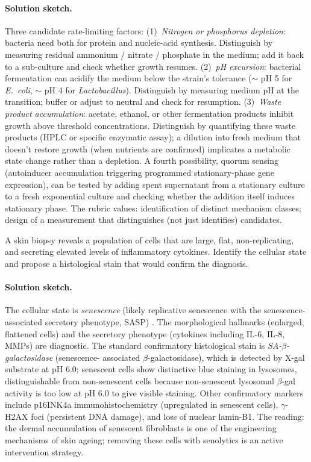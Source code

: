 \paragraph{Solution sketch.}
Three candidate rate-limiting factors:
(1)~\emph{Nitrogen or phosphorus depletion}: bacteria need both for
protein and nucleic-acid synthesis. Distinguish by measuring residual
ammonium / nitrate / phosphate in the medium; add it back to a
sub-culture and check whether growth resumes.
(2)~\emph{pH excursion}: bacterial fermentation can acidify the
medium below the strain's tolerance ($\sim$ pH 5 for \emph{E.~coli},
$\sim$ pH 4 for \emph{Lactobacillus}). Distinguish by measuring
medium pH at the transition; buffer or adjust to neutral and check
for resumption.
(3)~\emph{Waste product accumulation}: acetate, ethanol, or other
fermentation products inhibit growth above threshold concentrations.
Distinguish by quantifying these waste products (HPLC or specific
enzymatic assay); a dilution into fresh medium that doesn't restore
growth (when nutrients are confirmed) implicates a metabolic state
change rather than a depletion. A fourth possibility, quorum sensing
(autoinducer accumulation triggering programmed stationary-phase
gene expression), can be tested by adding spent supernatant from a
stationary culture to a fresh exponential culture and checking
whether the addition itself induces stationary phase. The rubric
values: identification of distinct mechanism classes; design of a
measurement that distinguishes (not just identifies) candidates.

\begin{exercise}
A skin biopsy reveals a population of cells that are large, flat,
non-replicating, and secreting elevated levels of inflammatory
cytokines. Identify the cellular state and propose a histological
stain that would confirm the diagnosis.
\end{exercise}

\paragraph{Solution sketch.}
The cellular state is \emph{senescence} (likely replicative
senescence with the senescence-associated secretory phenotype, SASP)
\cite{paper:v6c01-campisi-2013}. The morphological hallmarks
(enlarged, flattened cells) and the secretory phenotype (cytokines
including IL-6, IL-8, MMPs) are diagnostic. The standard confirmatory
histological stain is \emph{SA-$\beta$-galactosidase} (senescence-
associated $\beta$-galactosidase), which is detected by X-gal
substrate at pH $6.0$; senescent cells show distinctive blue staining
in lysosomes, distinguishable from non-senescent cells because
non-senescent lysosomal $\beta$-gal activity is too low at pH $6.0$
to give visible staining. Other confirmatory markers include
p16INK4a immunohistochemistry (upregulated in senescent cells),
$\gamma$-H2AX foci (persistent DNA damage), and loss of nuclear
lamin-B1. The reading: the dermal accumulation of senescent
fibroblasts is one of the engineering mechanisms of skin ageing;
removing these cells with senolytics is an active intervention
strategy.

